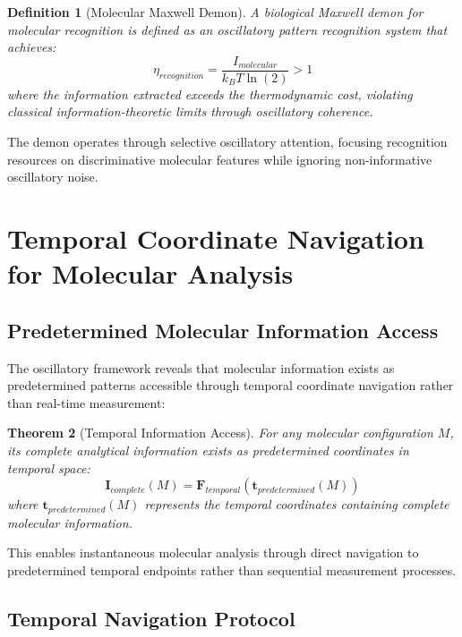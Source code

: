 \documentclass[12pt,a4paper]{article}
\newtheorem{theorem}{Theorem}[section]
\newtheorem{definition}[theorem]{Definition}
\begin{document}
\begin{definition}[Molecular Maxwell Demon]
A biological Maxwell demon for molecular recognition is defined as an oscillatory pattern recognition system that achieves:
\begin{equation}
\eta_{recognition} = \frac{I_{molecular}}{k_B T \ln(2)} > 1
\end{equation}
where the information extracted exceeds the thermodynamic cost, violating classical information-theoretic limits through oscillatory coherence.
\end{definition}

The demon operates through selective oscillatory attention, focusing recognition resources on discriminative molecular features while ignoring non-informative oscillatory noise.

\section{Temporal Coordinate Navigation for Molecular Analysis}

\subsection{Predetermined Molecular Information Access}

The oscillatory framework reveals that molecular information exists as predetermined patterns accessible through temporal coordinate navigation rather than real-time measurement:

\begin{theorem}[Temporal Information Access]
For any molecular configuration $M$, its complete analytical information exists as predetermined coordinates in temporal space:
\begin{equation}
\mathbf{I}_{complete}(M) = \mathbf{F}_{temporal}(\mathbf{t}_{predetermined}(M))
\end{equation}
where $\mathbf{t}_{predetermined}(M)$ represents the temporal coordinates containing complete molecular information.
\end{theorem}

This enables instantaneous molecular analysis through direct navigation to predetermined temporal endpoints rather than sequential measurement processes.

\subsection{Temporal Navigation Protocol}
\end{document}
